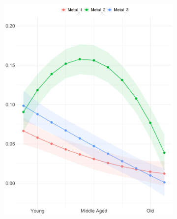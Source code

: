 \documentclass[a4paper,12pt]{extarticle}
\begin{document}
\begin{figure}[t!]
     \begin{subfigure}[b]{0.45\textwidth}
        \centering    
        \includegraphics[width=1.0\textwidth]{Plots/Micro/micro-by-age-metal.png}
        \caption{}
        \label{fig:age-metal}
    \end{subfigure}
     \begin{subfigure}[b]{0.45\textwidth}
        \centering    

\end{subfigure}
\end{figure}
\end{document}
